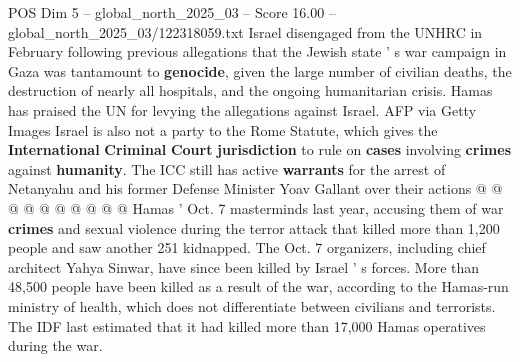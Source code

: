 \begin{textsample}{POS Dim 5 – global\_north\_2025\_03 – Score 16.00 – global\_north\_2025\_03/122318059.txt}
Israel disengaged from the UNHRC in February following previous allegations that the Jewish state ' s war campaign in Gaza was tantamount to \textbf{genocide}, given the large number of civilian deaths, the destruction of nearly all hospitals, and the ongoing humanitarian crisis.
Hamas has praised the UN for levying the allegations against Israel.
AFP via Getty Images Israel is also not a party to the Rome Statute, which gives the \textbf{International} \textbf{Criminal} \textbf{Court} \textbf{jurisdiction} to rule on \textbf{cases} involving \textbf{crimes} against \textbf{humanity}.
The ICC still has active \textbf{warrants} for the arrest of Netanyahu and his former Defense Minister Yoav Gallant over their actions @ @ @ @ @ @ @ @ @ @ Hamas ' Oct. 7 masterminds last year, accusing them of war \textbf{crimes} and sexual violence during the terror attack that killed more than 1,200 people and saw another 251 kidnapped.
The Oct. 7 organizers, including chief architect Yahya Sinwar, have since been killed by Israel ' s forces.
More than 48,500 people have been killed as a result of the war, according to the Hamas-run ministry of health, which does not differentiate between civilians and terrorists.
The IDF last estimated that it had killed more than 17,000 Hamas operatives during the war.

\end{textsample}
